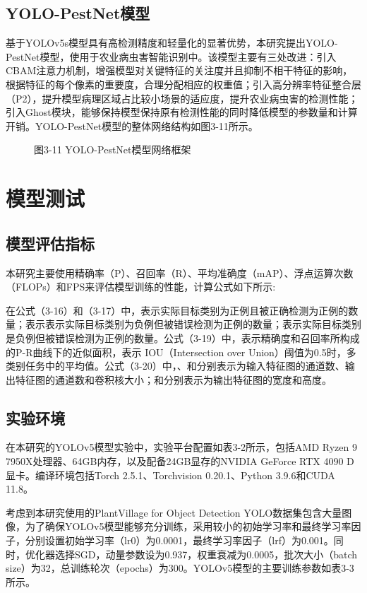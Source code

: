 \documentclass[12pt, a4paper, twoside]{ctexart}
\begin{document}
\subsection{YOLO-PestNet模型}

基于YOLOv5s模型具有高检测精度和轻量化的显著优势，本研究提出YOLO-PestNet模型，使用于农业病虫害智能识别中。该模型主要有三处改进：引入CBAM注意力机制，增强模型对关键特征的关注度并且抑制不相干特征的影响，根据特征的每个像素的重要度，合理分配相应的权重值；引入高分辨率特征整合层（P2），提升模型病理区域占比较小场景的适应度，提升农业病虫害的检测性能；引入Ghost模块，能够保持模型保持原有检测性能的同时降低模型的参数量和计算开销。YOLO-PestNet模型的整体网络结构如图3-11所示。


\begin{figure}[htbp]
\centering
\caption{图3-11 YOLO-PestNet模型网络框架}
\end{figure}


\section{模型测试}


\subsection{模型评估指标}

本研究主要使用精确率（P）、召回率（R）、平均准确度（mAP）、浮点运算次数（FLOPs）和FPS来评估模型训练的性能，计算公式如下所示:

在公式（3-16）和（3-17）中，表示实际目标类别为正例且被正确检测为正例的数量；表示表示实际目标类别为负例但被错误检测为正例的数量；表示实际目标类别是负例但被错误检测为正例的数量。公式（3-19）中，表示精确度和召回率所构成的P-R曲线下的近似面积，表示 IOU（Intersection over Union）阈值为0.5时，多类别任务中的平均值。公式（3-20）中，、和分别表示为输入特征图的通道数、输出特征图的通道数和卷积核大小；和分别表示为输出特征图的宽度和高度。


\subsection{实验环境}

在本研究的YOLOv5模型实验中，实验平台配置如表3-2所示，包括AMD Ryzen 9 7950X处理器、64GB内存，以及配备24GB显存的NVIDIA GeForce RTX 4090 D显卡。编译环境包括Torch 2.5.1、Torchvision 0.20.1、Python 3.9.6和CUDA 11.8。

考虑到本研究使用的PlantVillage for Object Detection YOLO数据集包含大量图像，为了确保YOLOv5模型能够充分训练，采用较小的初始学习率和最终学习率因子，分别设置初始学习率（lr0）为0.0001，最终学习率因子（lrf）为0.001。同时，优化器选择SGD，动量参数设为0.937，权重衰减为0.0005，批次大小（batch size）为32，总训练轮次（epochs）为300。YOLOv5模型的主要训练参数如表3-3所示。
\end{document}
